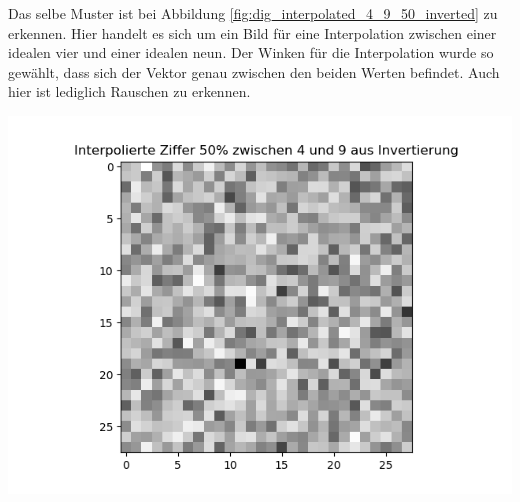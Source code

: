 \documentclass[Interploate_hadwritten_Digits.tex]{subfiles}
\begin{document}
	Das selbe Muster ist bei Abbildung \ref{fig:dig_interpolated_4_9_50_inverted} zu erkennen. Hier handelt es sich um ein Bild für eine Interpolation zwischen einer idealen vier und einer idealen neun. Der Winken für die Interpolation wurde so gewählt, dass sich der Vektor genau zwischen den beiden Werten befindet. Auch hier ist lediglich Rauschen zu erkennen.
	\begin{Figure}
		\centering
		\includegraphics[width=\linewidth]{img/results/interpolated_4_9_50_inverted.png}
		\label{fig:dig_interpolated_4_9_50_inverted}
	\end{Figure}
	
\end{document}
